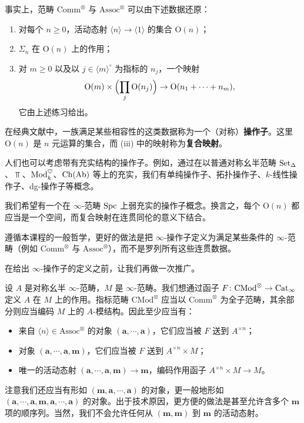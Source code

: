 \nitem\label{L21-2.2} 事实上，范畴 $\mathrm{Comm}^{\otimes}$ 与 $\mathrm{Assoc}^{\otimes}$ 可以由下述数据还原：
\begin{enumerate}[label=(\roman*),leftmargin=2.4em,itemsep=0.1em]
\item 对每个 $n\ge0$，活动态射 $\langle n\rangle\to\langle 1\rangle$ 的集合 $\mathrm{O}(n)$；
\item $\Sigma_n$ 在 $\mathrm{O}(n)$ 上的作用；
\item 对 $m\ge0$ 以及以 $j\in\langle m\rangle^{\circ}$ 为指标的 $n_j$，一个映射
\[
\mathrm{O}(m)\times\Bigl(\prod_j\mathrm{O}(n_j)\Bigr)\to\mathrm{O}(n_1+\cdots+n_m),
\]
它由上述练习给出。
\end{enumerate}
在经典文献中，一族满足某些相容性的这类数据称为一个（对称）\textbf{操作子}。这里 $\mathrm{O}(n)$ 是 $n$ 元运算的集合，而 (iii) 中的映射称为\textbf{复合映射}。

\nitem\label{L21-2.3} 人们也可以考虑带有充实结构的操作子。例如，通过在以普通对称幺半范畴 $\operatorname{Set}_{\Delta}$、$\Top$、$\operatorname{Mod}_k^{\heartsuit}$、$\operatorname{Ch}(\operatorname{Ab})$ 等上的充实，我们有单纯操作子、拓扑操作子、$k$-线性操作子、dg-操作子等概念。

我们希望有一个在 $\infty$-范畴 $\operatorname{Spc}$ 上弱充实的操作子概念。换言之，每个 $\mathrm{O}(n)$ 都应当是一个空间，而复合映射在连贯同伦的意义下结合。

遵循本课程的一般哲学，更好的做法是把 $\infty$-操作子定义为满足某些条件的 $\infty$-范畴（例如 $\mathrm{Comm}^{\otimes}$ 与 $\mathrm{Assoc}^{\otimes}$），而不是罗列所有这些连贯数据。

\nitem\label{L21-2.4} 在给出 $\infty$-操作子的定义之前，让我们再做一次推广。

设 $A$ 是对称幺半 $\infty$-范畴，$M$ 是 $\infty$-范畴。我们想通过函子 $F\colon\mathrm{CMod}^{\otimes}\to\operatorname{Cat}_{\infty}$ 定义 $A$ 在 $M$ 上的作用。指标范畴 $\mathrm{CMod}^{\otimes}$ 应当以 $\mathrm{Comm}^{\otimes}$ 为全子范畴，其余部分则应当编码 $M$ 上的 $A$-模结构。因此至少应当有：
\begin{itemize}[leftmargin=2.2em,itemsep=0.1em]
\item 来自 $\langle n\rangle\in\mathrm{Assoc}^{\otimes}$ 的对象 $(\mathbf{a},\cdots,\mathbf{a})$，它们应当被 $F$ 送到 $A^{\times n}$；
\item 对象 $(\mathbf{a},\cdots,\mathbf{a},\mathbf{m})$，它们应当被 $F$ 送到 $A^{\times n}\times M$；
\item 唯一的活动态射 $(\mathbf{a},\cdots,\mathbf{a},\mathbf{m})\to\mathbf{m}$，编码作用函子 $A^{\times n}\times M\to M$。
\end{itemize}
注意我们还应当有形如 $(\mathbf{m},\mathbf{a},\cdots,\mathbf{a})$ 的对象，更一般地形如 $(\mathbf{a},\cdots,\mathbf{a},\mathbf{m},\mathbf{a},\cdots,\mathbf{a})$ 的对象。出于技术原因，更方便的做法是甚至允许含多个 $\mathbf{m}$ 项的顺序列。当然，我们不会允许任何从 $(\mathbf{m},\mathbf{m})$ 到 $\mathbf{m}$ 的活动态射。

